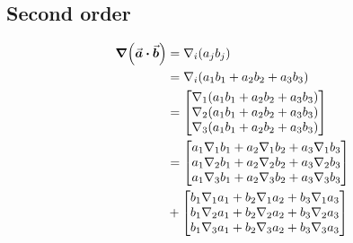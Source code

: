 \documentclass[dvipdfmx,autodetect-engine]{article}
\begin{document}
\subsection{Second order}
\begin{align}
    \grad \pqty{\va*{a} \vdot \va*{b}}
    &= \nabla_i \pqty{a_j b_j}
    \\
    &= \nabla_i \pqty{a_1 b_1 + a_2 b_2 + a_3 b_3}
    \\
    &= \mqty[
        \nabla_1 \pqty{a_1 b_1 + a_2 b_2 + a_3 b_3} \\
        \nabla_2 \pqty{a_1 b_1 + a_2 b_2 + a_3 b_3} \\
        \nabla_3 \pqty{a_1 b_1 + a_2 b_2 + a_3 b_3}
    ]
    \\
    &= \mqty[
        a_1 \nabla_1 b_1 + a_2 \nabla_1 b_2 + a_3 \nabla_1 b_3  \\
        a_1 \nabla_2 b_1 + a_2 \nabla_2 b_2 + a_3 \nabla_2 b_3  \\
        a_1 \nabla_3 b_1 + a_2 \nabla_3 b_2 + a_3 \nabla_3 b_3  \\
    ] 
    \\
    & + \mqty[
        b_1 \nabla_1 a_1 + b_2 \nabla_1 a_2 + b_3 \nabla_1 a_3  \\
        b_1 \nabla_2 a_1 + b_2 \nabla_2 a_2 + b_3 \nabla_2 a_3  \\
        b_1 \nabla_3 a_1 + b_2 \nabla_3 a_2 + b_3 \nabla_3 a_3  \\
    ]
\end{align}
\end{document}
